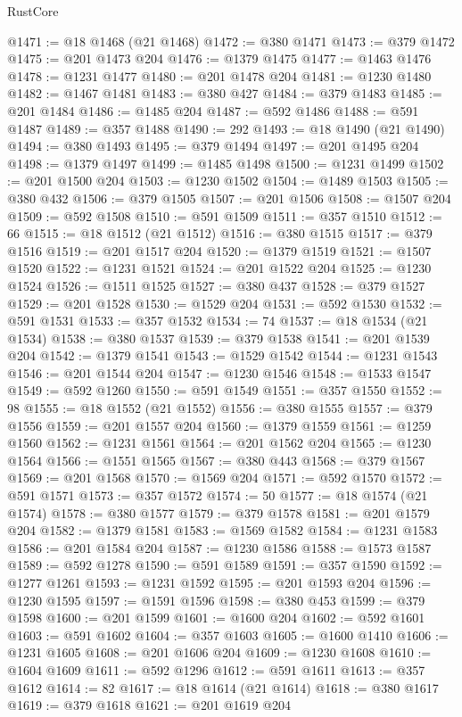\begin{lexlean}{RustCore}
\begin{coremodule}
@1471 := @18 @1468 (@21 @1468)
@1472 := @380 @1471
@1473 := @379 @1472
@1475 := @201 @1473 @204
@1476 := @1379 @1475
@1477 := @1463 @1476
@1478 := @1231 @1477
@1480 := @201 @1478 @204
@1481 := @1230 @1480
@1482 := @1467 @1481
@1483 := @380 @427
@1484 := @379 @1483
@1485 := @201 @1484
@1486 := @1485 @204
@1487 := @592 @1486
@1488 := @591 @1487
@1489 := @357 @1488
@1490 := 292
@1493 := @18 @1490 (@21 @1490)
@1494 := @380 @1493
@1495 := @379 @1494
@1497 := @201 @1495 @204
@1498 := @1379 @1497
@1499 := @1485 @1498
@1500 := @1231 @1499
@1502 := @201 @1500 @204
@1503 := @1230 @1502
@1504 := @1489 @1503
@1505 := @380 @432
@1506 := @379 @1505
@1507 := @201 @1506
@1508 := @1507 @204
@1509 := @592 @1508
@1510 := @591 @1509
@1511 := @357 @1510
@1512 := 66
@1515 := @18 @1512 (@21 @1512)
@1516 := @380 @1515
@1517 := @379 @1516
@1519 := @201 @1517 @204
@1520 := @1379 @1519
@1521 := @1507 @1520
@1522 := @1231 @1521
@1524 := @201 @1522 @204
@1525 := @1230 @1524
@1526 := @1511 @1525
@1527 := @380 @437
@1528 := @379 @1527
@1529 := @201 @1528
@1530 := @1529 @204
@1531 := @592 @1530
@1532 := @591 @1531
@1533 := @357 @1532
@1534 := 74
@1537 := @18 @1534 (@21 @1534)
@1538 := @380 @1537
@1539 := @379 @1538
@1541 := @201 @1539 @204
@1542 := @1379 @1541
@1543 := @1529 @1542
@1544 := @1231 @1543
@1546 := @201 @1544 @204
@1547 := @1230 @1546
@1548 := @1533 @1547
@1549 := @592 @1260
@1550 := @591 @1549
@1551 := @357 @1550
@1552 := 98
@1555 := @18 @1552 (@21 @1552)
@1556 := @380 @1555
@1557 := @379 @1556
@1559 := @201 @1557 @204
@1560 := @1379 @1559
@1561 := @1259 @1560
@1562 := @1231 @1561
@1564 := @201 @1562 @204
@1565 := @1230 @1564
@1566 := @1551 @1565
@1567 := @380 @443
@1568 := @379 @1567
@1569 := @201 @1568
@1570 := @1569 @204
@1571 := @592 @1570
@1572 := @591 @1571
@1573 := @357 @1572
@1574 := 50
@1577 := @18 @1574 (@21 @1574)
@1578 := @380 @1577
@1579 := @379 @1578
@1581 := @201 @1579 @204
@1582 := @1379 @1581
@1583 := @1569 @1582
@1584 := @1231 @1583
@1586 := @201 @1584 @204
@1587 := @1230 @1586
@1588 := @1573 @1587
@1589 := @592 @1278
@1590 := @591 @1589
@1591 := @357 @1590
@1592 := @1277 @1261
@1593 := @1231 @1592
@1595 := @201 @1593 @204
@1596 := @1230 @1595
@1597 := @1591 @1596
@1598 := @380 @453
@1599 := @379 @1598
@1600 := @201 @1599
@1601 := @1600 @204
@1602 := @592 @1601
@1603 := @591 @1602
@1604 := @357 @1603
@1605 := @1600 @1410
@1606 := @1231 @1605
@1608 := @201 @1606 @204
@1609 := @1230 @1608
@1610 := @1604 @1609
@1611 := @592 @1296
@1612 := @591 @1611
@1613 := @357 @1612
@1614 := 82
@1617 := @18 @1614 (@21 @1614)
@1618 := @380 @1617
@1619 := @379 @1618
@1621 := @201 @1619 @204

\end{coremodule}
\end{lexlean}
